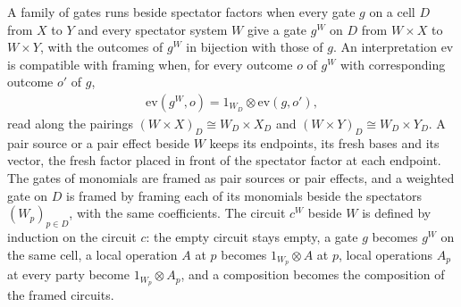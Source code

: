 \begin{definition}
    \label{def:party_gate_frame}
    \leanok
    A family of gates runs beside spectator factors when every gate $g$ on a cell
    $D$ from $X$ to $Y$ and every spectator system $W$ give a gate $g^W$ on $D$ from
    $W\times X$ to $W\times Y$, with the outcomes of $g^W$ in bijection with those
    of $g$. An interpretation $\mathrm{ev}$ is compatible with framing when, for
    every outcome $o$ of $g^W$ with corresponding outcome $o'$ of $g$,
    \begin{align}
        \mathrm{ev}(g^W,o)=1_{W_D}\otimes\mathrm{ev}(g,o'),
        \label{eq:party_frame_compatible}
    \end{align}
    read along the pairings $(W\times X)_D\cong W_D\times X_D$ and
    $(W\times Y)_D\cong W_D\times Y_D$. A pair source or a pair effect beside $W$
    keeps its endpoints, its fresh bases and its vector, the fresh factor placed in
    front of the spectator factor at each endpoint. The gates of monomials are
    framed as pair sources or pair effects, and a weighted gate on $D$ is framed by
    framing each of its monomials beside the spectators $(W_p)_{p\in D}$, with the
    same coefficients. The circuit $c^W$ beside $W$ is defined by induction on
    the circuit $c$: the empty circuit stays empty, a gate $g$ becomes $g^W$ on the
    same cell, a local operation $A$ at $p$ becomes $1_{W_p}\otimes A$ at $p$, local
    operations $A_p$ at every party become $1_{W_p}\otimes A_p$, and a composition
    becomes the composition of the framed circuits.
\end{definition}

